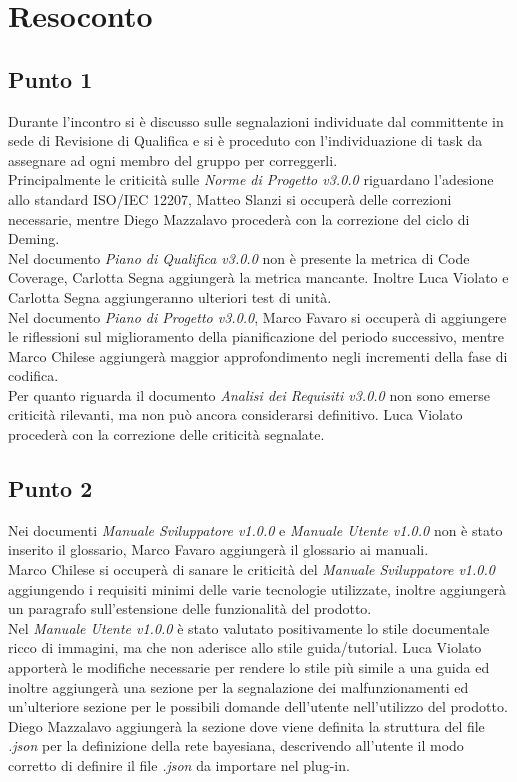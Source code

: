 \section{Resoconto}

\subsection{Punto 1}
Durante l'incontro si è discusso sulle segnalazioni individuate dal committente in sede di Revisione di Qualifica e si è proceduto con l'individuazione di task da assegnare ad ogni membro del gruppo per correggerli.
\\
Principalmente le criticità sulle \textit{Norme di Progetto v3.0.0} riguardano l'adesione allo standard ISO/IEC 12207, Matteo Slanzi si occuperà delle correzioni necessarie, mentre Diego Mazzalavo procederà con la correzione del ciclo di Deming. \\
Nel documento  \textit{Piano di Qualifica v3.0.0} non è presente la metrica di Code Coverage, Carlotta Segna aggiungerà la metrica mancante. Inoltre Luca Violato e Carlotta Segna aggiungeranno ulteriori test di unità. \\
Nel documento \textit{Piano di Progetto v3.0.0}, Marco Favaro si occuperà di aggiungere le riflessioni sul miglioramento della pianificazione del periodo successivo, mentre Marco Chilese aggiungerà maggior approfondimento negli incrementi della fase di codifica. \\
Per quanto riguarda il documento \textit{Analisi dei Requisiti v3.0.0} non sono emerse criticità rilevanti, ma non può ancora considerarsi definitivo. Luca Violato procederà con la correzione delle criticità segnalate.

\subsection{Punto 2}
Nei documenti \textit{Manuale Sviluppatore v1.0.0} e \textit{Manuale Utente v1.0.0} non è stato inserito il glossario, Marco Favaro aggiungerà il glossario ai manuali. \\
Marco Chilese si occuperà di sanare le criticità del \textit{Manuale Sviluppatore v1.0.0} aggiungendo i requisiti minimi delle varie tecnologie utilizzate, inoltre aggiungerà un paragrafo sull'estensione delle funzionalità del prodotto. \\
Nel \textit{Manuale Utente v1.0.0} è stato valutato positivamente lo stile documentale ricco di immagini, ma che non aderisce allo stile guida/tutorial. Luca Violato apporterà le modifiche necessarie per rendere lo stile più simile a una guida ed inoltre aggiungerà una sezione per la segnalazione dei malfunzionamenti ed un'ulteriore sezione per le possibili domande dell'utente nell'utilizzo del prodotto. \\
Diego Mazzalavo aggiungerà la sezione dove viene definita la struttura del file \textit{.json} per la definizione della rete bayesiana, descrivendo all'utente il modo corretto di definire il file \textit{.json} da importare nel plug-in.  

